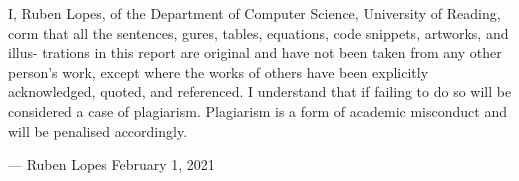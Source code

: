 I, Ruben Lopes, of the Department of Computer Science, University of Reading,
corm that all the sentences, gures, tables, equations, code snippets, artworks, and illus-
trations in this report are original and have not been taken from any other person's work,
except where the works of others have been explicitly acknowledged, quoted, and referenced.
I understand that if failing to do so will be considered a case of plagiarism. Plagiarism is a
form of academic misconduct and will be penalised accordingly.

\hspace*{0pt}\hfill --- Ruben Lopes 
\break{}
\hspace*{0pt}\hfill February 1, 2021
